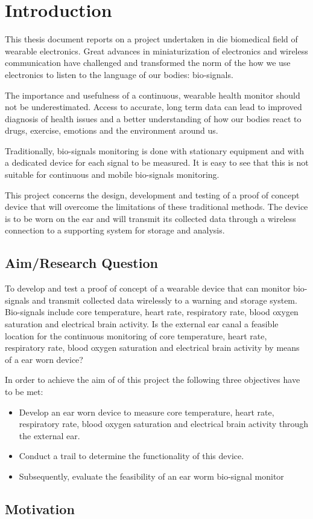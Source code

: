 \chapter{Introduction}
\label{chp:Intro}
This thesis document reports on a project undertaken in die biomedical field of wearable electronics. Great advances in miniaturization of electronics and wireless communication have challenged and transformed the norm of the how we use electronics to listen to the language of our bodies: bio-signals.

The importance and usefulness of a continuous, wearable health monitor should not be underestimated. Access to accurate, long term data can lead to improved diagnosis of health issues and a better understanding of how our bodies react to drugs, exercise, emotions and the environment around us.

Traditionally, bio-signals monitoring is done with stationary equipment and with a dedicated device for each signal to be measured. It is easy to see that this is not suitable for continuous and mobile bio-signals monitoring. 

This project concerns the design, development and testing of a proof of concept device that will overcome the limitations of these traditional methods. The device is to be worn on the ear and will transmit its collected data through a wireless connection to a supporting system for storage and analysis.


\section{Aim/Research Question}
To develop and test a proof of concept of a wearable device that can monitor bio-signals and transmit collected data wirelessly to a warning and storage system. Bio-signals include core temperature, heart rate, respiratory rate, blood oxygen saturation and electrical brain activity.
Is the external ear canal a feasible location for the continuous monitoring of core temperature, heart rate, respiratory rate, blood oxygen saturation and electrical brain activity by means of a ear worn device?

In order to achieve the aim of of this project the following three objectives have to be met:
\begin{itemize}
\item Develop an ear worn device to measure core temperature, heart rate, respiratory rate, blood oxygen saturation and electrical brain activity through the external ear.
\item Conduct a trail to determine the functionality of this device.
\item Subsequently, evaluate the feasibility of an ear worm bio-signal monitor
\end{itemize}

\section{Motivation}